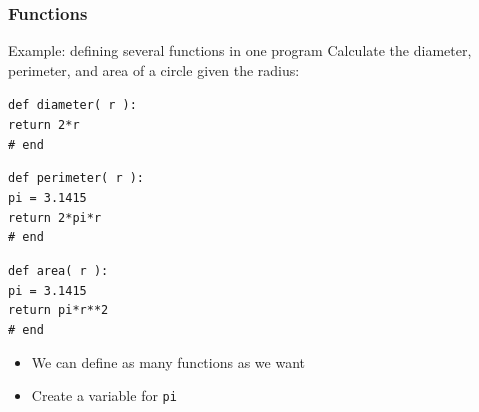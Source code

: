 \documentclass{beamer}
\newcommand{\code}[1]{\texttt{#1}}
\newcommand{\tab}{\hspace*{22pt}}
\begin{document}
\begin{frame}%
	\frametitle{Functions}
	
	\begin{block}{Example: defining several functions in one program}
		Calculate the diameter, perimeter, and area of a circle given the radius:
		
		\vspace{15pt}
			\code{def diameter( r ): \\
    			\tab return 2*r \\
			\# end
			}
			
			\vspace{10pt}
			
			\code{def perimeter( r ): \\
			\tab pi = 3.1415 \\
    			\tab return 2*pi*r \\
			\# end
			}
			
			\vspace{10pt}
			
			\code{def area( r ): \\
			\tab pi = 3.1415 \\
    			\tab return pi*r**2 \\
			\# end
			}
		\endminipage\hfill
			\begin{itemize}				
				\item We can define as many functions as we want
				\item Create a variable for \code{pi}
			\end{itemize}
		\endminipage\hfill
	\end{block}
	
\end{frame}
\end{document}

